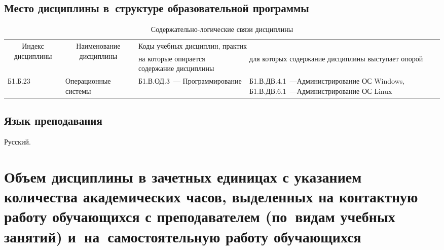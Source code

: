 \documentclass[a4paper,12pt]{article}
\begin{document}
\subsection{Место дисциплины в~структуре образовательной программы}

  \begin{table}[H]
  \setlength\arraycolsep{3pt}
  \caption{Содержательно-логические связи дисциплины}
  \begin{tabular}{|l|p{18ex}|*{2}{p{23ex}|}}
  \hline
  \multicolumn{1}{|c|}{\multirow{2}{13ex}{\centering Индекс \linebreak дисциплины}} &
  \multicolumn{1}{c|}{\multirow{2}{18ex}{\centering Наименование \linebreak дисциплины}} & 
  \multicolumn{2}{p{46ex}|}{\centering Коды учебных дисциплин, практик} \\
  \cline{3-4}
   & & 
  \centering на которые опирается содержание дисциплины & 
  \centering\arraybackslash для которых содержание дисциплины выступает опорой
  \\ \hline
  Б1.Б.23 & Операционные системы 
  & 
  \raggedright
  
  Б1.В.ОД.3~--- Программирование 
  & 
  \raggedright\arraybackslash
  
  Б1.В.ДВ.4.1~---Администрирование ОС Windows,
  Б1.В.ДВ.6.1~---Администрирование ОС Linux 
  \\ \hline
  \end{tabular}
  \end{table}


\subsection{Язык преподавания} 
  Русский.
  



\newpage

\section{Объем дисциплины в зачетных единицах с указанием количества академических часов, выделенных на контактную работу обучающихся с преподавателем (по~видам учебных занятий) и~на~самостоятельную работу обучающихся}
\end{document}
